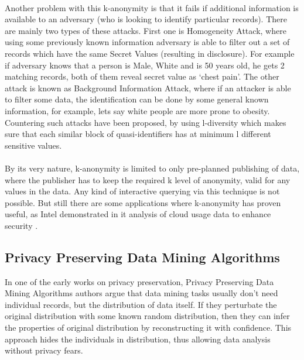 \documentclass[12pt]{report}
\begin{document}
\paragraph{}
Another problem with this k-anonymity is that it fails if additional information is available to an adversary (who is looking to identify particular records). There are mainly two types of these attacks. First one is Homogeneity Attack, where using some previously known information adversary is able to filter out a set of records which have the same Secret Values (resulting in disclosure). For example if adversary knows that a person is Male, White and is 50 years old, he gets 2 matching records, both of them reveal secret value as `chest pain'. The other attack is known as Background Information Attack, where if an attacker is able to filter some data, the identification can be done by some general known information, for example, lets say white people are more prone to obesity. Countering such attacks have been proposed, by using l-diversity \cite{machanavajjhala2006diversity} which makes sure that each similar block of quasi-identifiers has at minimum l different sensitive values.

\paragraph{}
By its very nature, k-anonymity is limited to only pre-planned publishing of data, where the publisher has to keep the required k level of anonymity, valid for any values in the data. Any kind of interactive querying via this technique is not possible. But still there are some applications where k-anonymity has proven useful, as Intel demonstrated in it analysis of cloud usage data to enhance security \cite{sedayao2012enhancing}. 




\subsection{Privacy Preserving Data Mining Algorithms}
In one of the early works on privacy preservation, Privacy Preserving Data Mining Algorithms \cite{agrawal2001design} authors argue that data mining tasks usually don’t need individual records, but the distribution of data itself. If they perturbate the original distribution with some known random distribution, then they can infer the properties of original distribution by reconstructing it with confidence. This approach hides the individuals in distribution, thus allowing data analysis without privacy fears.
\end{document}
